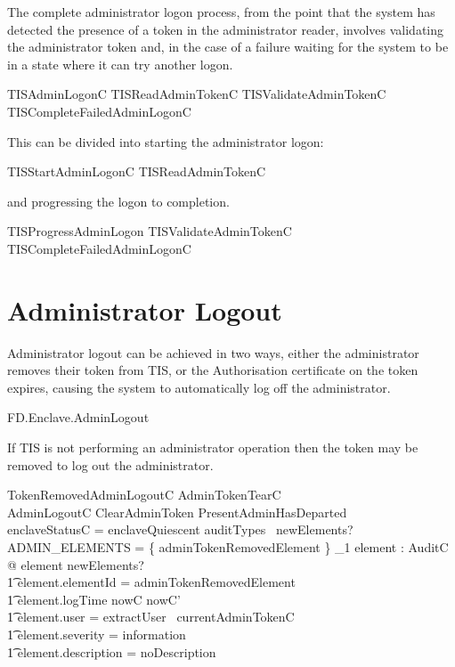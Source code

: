 The complete administrator logon process, from the point that the
system has detected the presence of a token in the administrator
reader, involves 
validating the administrator token and, in the case of a failure 
waiting for the system to be in a state where it can try another logon.

\begin{zed}
        TISAdminLogonC  TISReadAdminTokenC \lor
        TISValidateAdminTokenC \lor TISCompleteFailedAdminLogonC 
\end{zed}

This can be divided into starting the administrator logon:
\begin{zed}
        TISStartAdminLogonC  TISReadAdminTokenC  
\end{zed}
 
and progressing the logon to completion. 
\begin{zed}
        TISProgressAdminLogon  
        TISValidateAdminTokenC \lor TISCompleteFailedAdminLogonC 
\end{zed}

\section{Administrator Logout}
\label{sec:AdminLogout}

Administrator logout can be achieved in two ways, either the
administrator removes their token from TIS, or the Authorisation
certificate on the token expires, causing the system to automatically
log off the administrator.

\begin{traceunit}{FD.Enclave.AdminLogout}
\end{traceunit}

If TIS is not performing an administrator operation then the
token may be removed to log out the administrator.

\begin{schema}{TokenRemovedAdminLogoutC}
        AdminTokenTearC
\\      AdminLogoutC
\also
        ClearAdminToken
\where        
        PresentAdminHasDeparted
\\      enclaveStatusC = enclaveQuiescent
\also
        auditTypes~ newElements? \cap ADMIN\_ELEMENTS = 
        \{ adminTokenRemovedElement \} 
\also
        \exists_1 element : AuditC @ element \in newElements? 
\\ \t1  \land element.elementId = adminTokenRemovedElement
\\ \t1  \land element.logTime \in nowC \upto nowC'
\\ \t1  \land element.user = extractUser~ currentAdminTokenC
\\ \t1  \land element.severity = information
\\ \t1  \land element.description = noDescription
\end{schema}


